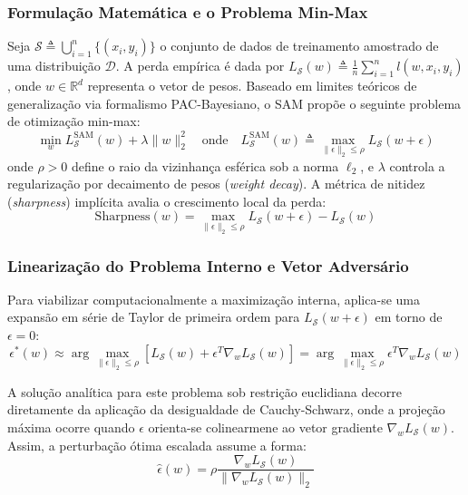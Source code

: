 \documentclass[12pt, a4paper]{article}
\begin{document}
\subsubsection{Formulação Matemática e o Problema Min-Max}
Seja $\mathcal{S} \triangleq \bigcup_{i=1}^{n} \{(x_i, y_i)\}$ o conjunto de dados de treinamento amostrado de uma distribuição $\mathcal{D}$. A perda empírica é dada por $L_{\mathcal{S}}(w) \triangleq \frac{1}{n}\sum_{i=1}^{n} l(w, x_i, y_i)$, onde $w \in \mathbb{R}^d$ representa o vetor de pesos. Baseado em limites teóricos de generalização via formalismo PAC-Bayesiano, o SAM propõe o seguinte problema de otimização min-max:
\begin{equation}
\min_{w} L_{\mathcal{S}}^{\text{SAM}}(w) + \lambda \|w\|_2^2 \quad \text{onde} \quad L_{\mathcal{S}}^{\text{SAM}}(w) \triangleq \max_{\|\epsilon\|_2 \le \rho} L_{\mathcal{S}}(w + \epsilon)
\end{equation}
onde $\rho > 0$ define o raio da vizinhança esférica sob a norma $\ell_2$, e $\lambda$ controla a regularização por decaimento de pesos (\textit{weight decay}). A métrica de nitidez (\textit{sharpness}) implícita avalia o crescimento local da perda:
\begin{equation}
\text{Sharpness}(w) = \max_{\|\epsilon\|_2 \le \rho} L_{\mathcal{S}}(w + \epsilon) - L_{\mathcal{S}}(w)
\end{equation}

\subsubsection{Linearização do Problema Interno e Vetor Adversário}
Para viabilizar computacionalmente a maximização interna, aplica-se uma expansão em série de Taylor de primeira ordem para $L_{\mathcal{S}}(w+\epsilon)$ em torno de $\epsilon = 0$:
\begin{equation}
\epsilon^*(w) \approx \arg\max_{\|\epsilon\|_2 \le \rho} \left[ L_{\mathcal{S}}(w) + \epsilon^T \nabla_w L_{\mathcal{S}}(w) \right] = \arg\max_{\|\epsilon\|_2 \le \rho} \epsilon^T \nabla_w L_{\mathcal{S}}(w)
\end{equation}

A solução analítica para este problema sob restrição euclidiana decorre diretamente da aplicação da desigualdade de Cauchy-Schwarz, onde a projeção máxima ocorre quando $\epsilon$ orienta-se colinearmene ao vetor gradiente $\nabla_w L_{\mathcal{S}}(w)$. Assim, a perturbação ótima escalada assume a forma:
\begin{equation}
\hat{\epsilon}(w) = \rho \frac{\nabla_w L_{\mathcal{S}}(w)}{\|\nabla_w L_{\mathcal{S}}(w)\|_2}
\end{equation}
\end{document}
